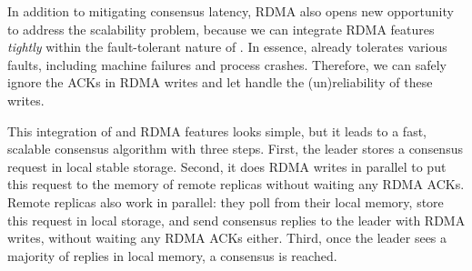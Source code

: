 

% 
In addition to mitigating consensus latency, RDMA also opens 
new opportunity to address the \paxos scalability problem, because we
can integrate RDMA features \emph{tightly} within the fault-tolerant nature of 
\paxos. In essence, \paxos already tolerates various faults, including 
machine failures and process crashes. Therefore, we can safely ignore the ACKs 
in RDMA writes and let \paxos handle the (un)reliability of these writes.

This integration of \paxos and RDMA features looks simple, but it leads to 
a fast, scalable \paxos consensus algorithm with three steps. First, the leader 
stores a consensus request in local stable storage. Second, it does RDMA writes 
in parallel to put this request to the memory of remote replicas without 
waiting any RDMA ACKs. Remote replicas also work in parallel: they poll from 
their local memory, store this request in local storage, and send consensus 
replies to the leader with RDMA writes, without waiting any RDMA ACKs 
either. Third, once the leader sees a majority of replies in local memory, 
a consensus is reached.

